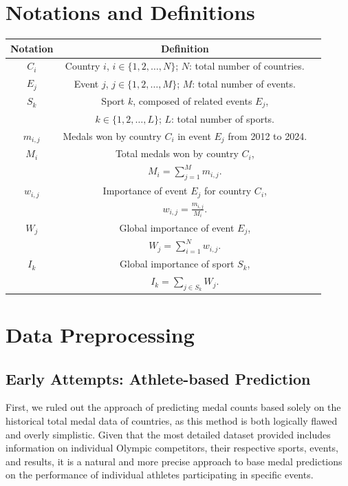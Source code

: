 \documentclass{mcmthesis}
\begin{document}
\section{Notations and Definitions}

\begin{table}[h!]
    \centering
    \begin{tabular}{ccc}
        \toprule
        \textbf{Notation} & \textbf{Definition} \\ 
        \midrule
        $C_i$ & Country $i$, $i \in \{1, 2, \ldots, N\}$; $N$: total number of countries. \\
        $E_j$ & Event $j$, $j \in \{1, 2, \ldots, M\}$; $M$: total number of events. \\
        $S_k$ & Sport $k$, composed of related events $E_j$, \\
             & $k \in \{1, 2, \ldots, L\}$; $L$: total number of sports. \\
        $m_{i,j}$ & Medals won by country $C_i$ in event $E_j$ from 2012 to 2024. \\
        $M_i$ & Total medals won by country $C_i$, \\
             & $M_i = \sum_{j=1}^M m_{i,j}.$ \\
        $w_{i,j}$ & Importance of event $E_j$ for country $C_i$, \\
             & $w_{i,j} = \frac{m_{i,j}}{M_i}.$ \\
        $W_j$ & Global importance of event $E_j$, \\
             & $W_j = \sum_{i=1}^N w_{i,j}.$ \\
        $I_k$ & Global importance of sport $S_k$, \\
             & $I_k = \sum_{j \in S_k} W_j.$ \\
        \bottomrule
    \end{tabular}

    \label{tab:notations}
\end{table}


\section{Data Preprocessing}
\subsection{Early Attempts: Athlete-based Prediction}
First, we ruled out the approach of predicting medal counts based solely on the historical total medal data of countries, as this method is both logically flawed and overly simplistic. Given that the most detailed dataset provided includes information on individual Olympic competitors, their respective sports, events, and results, it is a natural and more precise approach to base medal predictions on the performance of individual athletes participating in specific events.
\end{document}

